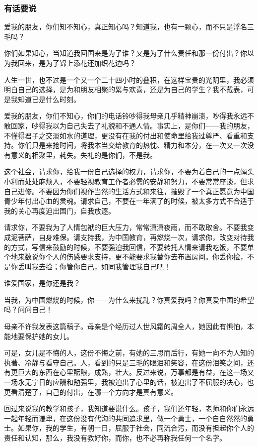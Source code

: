 \subsubsection*{有话要说}
\par 爱我的朋友，你们知不知心，真正知心吗？知道我，也有一颗心，而不只是浮名三毛吗？
\par 你们如果知心，当知道我回国来是为了谁？又是为了什么责任和那一份付出？你以为我回来，是为了锦上添花还加织花边吗？
\par 人生一世，也不过是一个又一个二十四小时的叠积，在这样宝贵的光阴里，我必须明白自己的选择，是为和朋友相聚的累与欢喜，还是为自己的学生？我不戴表，可是我知道已是什么时刻。
\par 爱我的朋友，你们不知心，你们的电话铃吵得我母亲几乎精神崩溃，吵得我永远不敢回家，吵得我以为自己失去了礼貌和不通人情。事实上，是你们——我的朋友，不懂得君子之交淡如水的道理，更没有在我的付出和使命里给我过尊严、看重和支持。你们只是来抢时间，将我本当交给教育的热忱、精力和本分，在一次又一次没有意义的相聚里，耗失。失礼的是你们，不是我。
\par 这个社会，请求你，给我一份自己选择的权力，请求你，不要为着自己的一点蝇头小利而处处麻烦人，不要轻视教育工作者必需的安静和努力，不要常常座谈，但求自己进修。不要因为你们视作当然的生活方式和来往，摧毁了一个真正愿意为中国青少年付出心血的灵魂。请求自己，不要在一年满了的时候，被太多方式不合适于我的关心再度迫出国门，自我放逐。
\par 请求你，不要我为了人情包袱的巨大压力，常常潇潇夜雨，而不敢取舍。不要我变成泥菩萨，自身难保。请支持我，为中国教育，再燃烧一次，请求你，改变对待我的方式，写信来鼓励的时候，不要强迫我回信，不要转托人情来请我吃饭，不要单个地来数说你个人的伤感要求支持，更不能要求我替你去布置房间。你丢你捡，不是你丢叫我去捡；你管你自己，如同我管理我自己吧！
\par 谁爱国家，是你还是我？
\par 当我，为中国燃烧的时候，你——为什么来扰乱？你真爱我吗？你真爱中国的希望吗？问问自己！
\par 母亲不许我发表这篇稿子。母亲是个经历过人世风霜的周全人，她因此有惧怕，本能地要保护她的女儿。
\par 可是，女儿是不悔的人，这份不悔之前，有她的三思而后行，有她一向不为人知的执著、冷静与看守自己。人，看到的只是三毛的眼泪和笑容，在这份泪笑之间，还有更巨大的东西在心里酝酿，成熟，壮大。反过来说，万事都是有益，在这一场又一场永无宁日的应酬和勉强里，我被迫出了心里的话，被迫出了不屈服的决心，也更看清楚了，自己的付出，在哪一个方向才是真有意义。
\par 回过来说我的教学和孩子，我知道要说什么。孩子，我们还年轻，老师和你们永远一起年轻而谦卑，在这份没有代沟的共同追求里，做一个勇士，一个自自然然的勇士。如果你，我的学生，有朝一日，屈服于社会，同流合污，而没有担起你个人的责任和认知，那么，我没有教好你，而你，也不必再称我任何一个名字。
